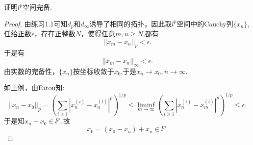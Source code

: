 \documentclass[lang=cn,10pt]{elegantbook}
\begin{document}
	\begin{example}
		证明\(l^p\)空间完备.
		\begin{proof}
			由练习1.1可知\(d_p\)和\(d_\infty\)诱导了相同的拓扑，因此取\(l^p\)空间中的Cauchy列\(\{x_n\}\),任给正数\(\epsilon\)，存在正整数\(N\)，使得任意\(m,n\ge N\),都有
			\[||x_m-x_n||_p<\epsilon.\]
			于是有
			\[||x_m-x_n||_\infty<\epsilon.\]
			由实数的完备性，\(\{x_n\}\)按坐标收敛于\(x_0\),于是\(x_n\to x_0,n\to \infty\).
			
			如上例，由Fatou知:
			\[||x_n-x_0||_p=(\sum_{i\ge1}|x_n^{(i)}-x_0^{(i)}|^p)^{1/p}\le \liminf_{m \to \infty}(\sum_{i\ge1}|x_n^{(i)}-x_m^{(i)}|^p)^{1/p}\le \epsilon.\]
			于是知\(x_n-x_0\in l^p,\)故
			\[x_0=(x_0-x_n)+x_n\in l^p.\]
		\end{proof}
	\end{example}
	
\end{document}
